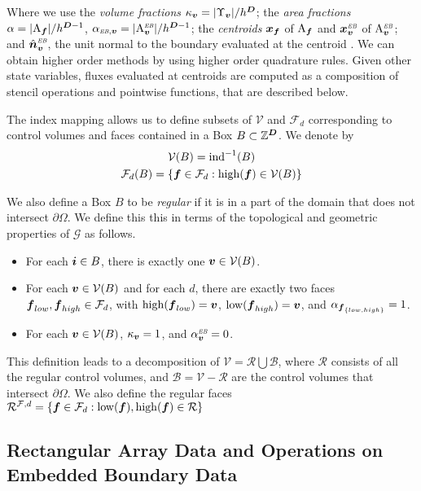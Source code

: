 \documentclass[12pt]{article}
\newcommand{\mcl}[1]{{\mathcal{#1}}}
\newcommand{\ind}{{\rm{ind}}}
\newcommand{\low}{{\rm{low}}}
\newcommand{\high}{{\rm{high}}}
\newcommand{\vol}[1]{{\Upsilon_{#1}}}
\newcommand{\area}[1]{{\rm{A}_{#1}}}
\newcommand{\vof}{{\mbf{v}}}
\newcommand{\face}{{\mbf{f}}}
\newcommand{\ebsub}{{\text{\it \tiny EB}}}
\newcommand{\areaEB}[1]{{{\rm A}_{#1}^{\ebsub}}}
\begin{document}
Where we use the {\it volume fractions} $\kappa_\vof = |\vol{\vof} |/h^\DIM$; the {\it area fractions} $\alpha = | \area{\face} | / h^{\DIM-1}$, $\alpha_{\ebsub,\vof} = |\areaEB{\vof} | /  h^{\DIM-1}$; the {\it centroids} $\mbf{x}_\face$ of $\area{\face}$ and $\mbf{x}_{\vof}^\ebsub$ of $\areaEB{\vof}$; and $\hat{\mbf{n}}_{\vof}^\ebsub$, the unit normal to the boundary evaluated at the centroid . We can obtain higher order methods by using higher order quadrature rules. Given other state variables, fluxes evaluated at centroids are computed as a composition of stencil operations and pointwise functions, that are described below.

The index mapping allows us to define subsets of $\mcl{V}$ and $\mcl{F}_d$ corresponding to control volumes and faces contained in a Box $B \subset \mathbb{Z}^{\boldsymbol{D}}$. We denote by 
\begin{gather*}
\mcl{V}(B) = \ind^{-1} (B) \\
\mcl{F}_d (B) = \{\face \in \mcl{F}_d: \high (\face ) \in \mcl{V}(B) \}
\end{gather*}

We also define a Box $B$ to be {\it regular} if it is in a part of the domain that does not intersect $\partial \Omega$. We define this this in terms of the topological and geometric properties of $\mcl{G}$ as follows.
\begin{itemize}
\item
For each ${\boldsymbol{i}} \in B$, there is exactly one $\vof \in \mcl{V}(B)$.
\item
For each $\vof \in \mcl{V}(B)$ and for each $d$, there are exactly two faces 
$\face_{low}, \face_{high} \in \mcl{F}_d$, with $\high(\face_{low}) = \vof$, $\low(\face_{high}) = \vof$, and $\alpha_{\face_{\{low,high\} }} = 1$.
\item
For each $\vof \in \mcl{V}(B)$, $\kappa_\vof = 1$, and $\alpha^\ebsub_\vof = 0$.
\end{itemize}

This definition leads to a decomposition of $\mcl{V} = \mcl{R} \bigcup \mcl{B}$, where $\mcl{R}$ consists of all the regular control volumes, and $\mcl{B} = \mcl{V} - \mcl{R}$ are the control volumes that intersect $\partial \Omega$. We also define the regular faces  $\mcl{R}^{\mcl{F},d} = \{\face \in \mcl{F}_d : \low(\face),\high(\face) \in \mcl{R}\}$

\subsection{Rectangular Array Data and Operations on Embedded Boundary Data}
\end{document}
